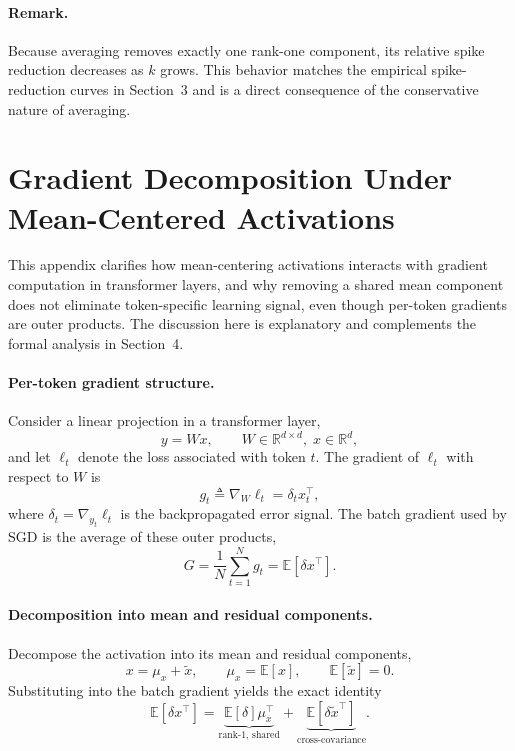 \paragraph{Remark.}
Because averaging removes exactly one rank-one component, its relative spike
reduction decreases as $k$ grows.
This behavior matches the empirical spike-reduction curves in Section~3 and is a
direct consequence of the conservative nature of averaging.

\section{Gradient Decomposition Under Mean-Centered Activations}
\label{app:grad_decomposition}

This appendix clarifies how mean-centering activations interacts with gradient
computation in transformer layers, and why removing a shared mean component does
not eliminate token-specific learning signal, even though per-token gradients
are outer products.
The discussion here is explanatory and complements the formal analysis in
Section~4.

\paragraph{Per-token gradient structure.}
Consider a linear projection in a transformer layer,
\[
y = Wx, \qquad W \in \mathbb{R}^{d \times d}, \; x \in \mathbb{R}^d,
\]
and let $\ell_t$ denote the loss associated with token $t$.
The gradient of $\ell_t$ with respect to $W$ is
\[
g_t \triangleq \nabla_W \ell_t = \delta_t x_t^\top,
\]
where $\delta_t = \nabla_{y_t} \ell_t$ is the backpropagated error signal.
The batch gradient used by SGD is the average of these outer products,
\[
G = \frac{1}{N}\sum_{t=1}^N g_t = \mathbb{E}[\delta x^\top].
\]

\paragraph{Decomposition into mean and residual components.}
Decompose the activation into its mean and residual components,
\[
x = \mu_x + \tilde{x},
\qquad
\mu_x = \mathbb{E}[x],
\qquad
\mathbb{E}[\tilde{x}] = 0.
\]
Substituting into the batch gradient yields the exact identity
\begin{equation}
\label{eq:grad_decomp}
\mathbb{E}[\delta x^\top]
=
\underbrace{\mathbb{E}[\delta]\mu_x^\top}_{\text{rank-1, shared}}
+
\underbrace{\mathbb{E}[\delta \tilde{x}^\top]}_{\text{cross-covariance}}.
\end{equation}

